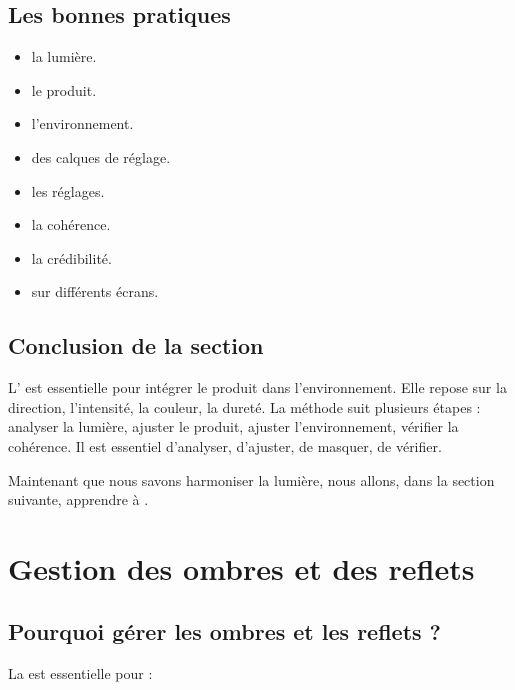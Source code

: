 \subsection{Les bonnes pratiques}

\begin{itemize}
    \item {} la lumière.
    \item {} le produit.
    \item {} l'environnement.
    \item {} des calques de réglage.
    \item {} les réglages.
    \item {} la cohérence.
    \item {} la crédibilité.
    \item {} sur différents écrans.
\end{itemize}

\subsection*{Conclusion de la section}

L' est essentielle pour intégrer le produit dans l'environnement. Elle repose sur la direction, l'intensité, la couleur, la dureté. La méthode suit plusieurs étapes : analyser la lumière, ajuster le produit, ajuster l'environnement, vérifier la cohérence. Il est essentiel d'analyser, d'ajuster, de masquer, de vérifier.

Maintenant que nous savons harmoniser la lumière, nous allons, dans la section suivante, apprendre à .

\section{Gestion des ombres et des reflets}

\subsection{Pourquoi gérer les ombres et les reflets ?}

La  est essentielle pour :

